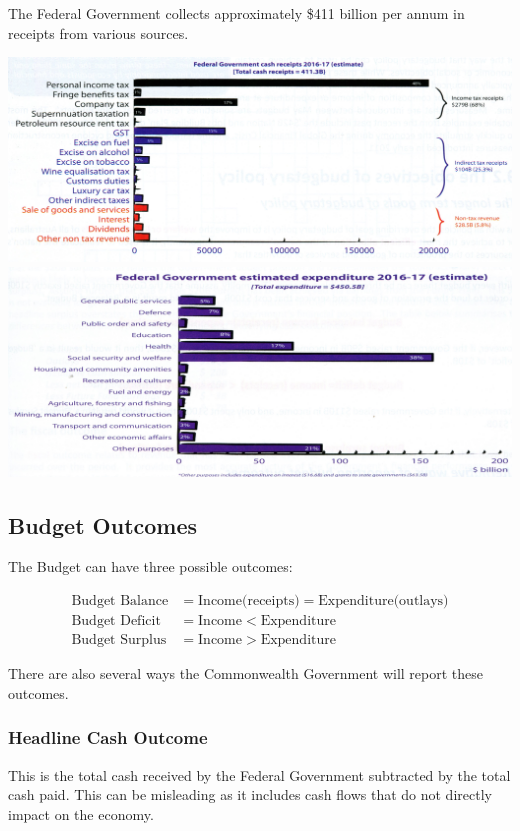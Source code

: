 \documentclass[11pt]{article}
\begin{document}
The Federal Government collects approximately \$411 billion per annum
in receipts from various sources.

\includegraphics[width=.9\linewidth]{./images/Receipts.jpg}
\includegraphics[width=.9\linewidth]{./images/Expenditure.jpg}


\subsection{Budget Outcomes}
\label{sec-1-4}

The Budget can have three possible outcomes:

\begin{align*}
        \text{Budget Balance} &= \text{Income(receipts)} = \text{Expenditure(outlays)}\\
    \text{Budget Deficit} &= \text{Income} < \text{Expenditure}\\
    \text{Budget Surplus} &= \text{Income} > \text{Expenditure}
\end{align*}

There are also several ways the Commonwealth Government will report
these outcomes.

\subsubsection{Headline Cash Outcome}
\label{sec-1-4-1}

This is the total cash received by the Federal Government subtracted
by the total cash paid. This can be misleading as it includes cash
flows that do not directly impact on the economy.
\end{document}
